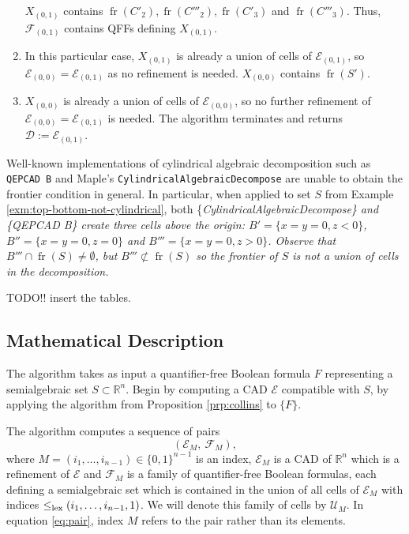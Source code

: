 \documentclass[
]{book}
\theoremstyle{definition}
\theoremstyle{definition}
\theoremstyle{definition}
\theoremstyle{definition}
\theoremstyle{remark}
\begin{document}
\begin{enumerate}
  \(X_{(0,1)}\) contains \({\operatorname{fr} \left( C'_2 \right)}, {\operatorname{fr} \left( C'''_2 \right)}, {\operatorname{fr} \left( C'_3 \right)}\) and \({\operatorname{fr} \left( C'''_3 \right)}\). Thus, \(\mathcal{F}_{(0,1)}\) contains QFFs defining \(X_{(0,1)}\).
\item
  In this particular case, \(X_{(0,1)}\) is already a union of cells of \(\mathcal{E}_{(0,1)}\), so \(\mathcal{E}_{(0,0)} = \mathcal{E}_{(0,1)}\) as no refinement is needed.
  \(X_{(0,0)}\) contains \({\operatorname{fr} \left( S' \right)}\).
\item
  \(X_{(0,0)}\) is already a union of cells of \(\mathcal{E}_{(0,0)}\), so no further refinement of \(\mathcal{E}_{(0,0)} = \mathcal{E}_{(0,1)}\) is needed. The algorithm terminates and returns \(\mathcal{D} := \mathcal{E}_{(0,1)}\).
\end{enumerate}

Well-known implementations of cylindrical algebraic decomposition such as \texttt{QEPCAD\ B} \citep{brownQepcad} and Maple's \texttt{CylindricalAlgebraicDecompose} \citep{chen2014} are unable to obtain the frontier condition in general. In particular, when applied to set \(S\) from Example \ref{exm:top-bottom-not-cylindrical}, both \{\em CylindricalAlgebraicDecompose\} and \{\em QEPCAD B\} create three cells above the origin: \(B' = \{ x = y = 0, z < 0\}\), \(B'' = \{ x = y = 0, z = 0\}\) and \(B''' = \{ x = y = 0, z > 0\}\). Observe that \(B''' \cap {\operatorname{fr} \left( S \right)} \ne \emptyset\), but \(B''' \not \subset {\operatorname{fr} \left( S \right)}\) so the frontier of \(S\) is not a union of cells in the decomposition.

TODO!! insert the tables.

\hypertarget{mathematical-description}{%
\subsection{Mathematical Description}\label{mathematical-description}}

The algorithm takes as input a quantifier-free Boolean formula \(F\) representing a semialgebraic set \(S \subset \mathbb{R}^n\). Begin by computing a CAD \(\mathcal{E}\) compatible with \(S\), by applying the algorithm from Proposition \ref{prp:collins} to \(\{ F \}\).

The algorithm computes a sequence of pairs
\begin{equation}
({\mathcal E}_M,\ \mathcal{F}_M),
\label{eq:pair}
\end{equation}
where \(M = (i_1,\ldots,i_{n-1}) \in \{0,1\}^{n-1}\) is an index, \(\mathcal{E}_M\) is a CAD of \(\mathbb{R}^n\) which is a refinement of \(\mathcal{E}\) and \(\mathcal{F}_M\) is a family of quantifier-free Boolean formulas, each defining a semialgebraic set which is contained in the union of all cells of \({\mathcal E}_M\) with indices \(\le_{\rm{lex}}(i_1,\ldots,i_{n-1},1)\). We will denote this family of cells by \(\mathcal{U}_M\).
In equation \eqref{eq:pair}, index \(M\) refers to the pair rather than its elements.
\end{document}
